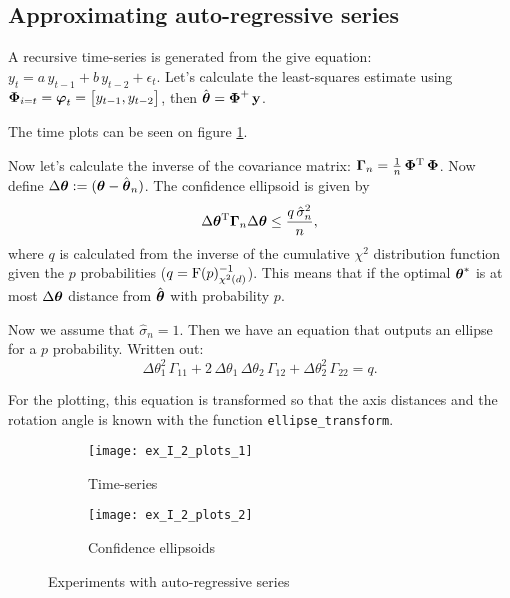 
\subsection{Approximating auto-regressive series}

A recursive time-series is generated from the give equation: $y_t = a\,y_{t-1} + b\,y_{t-2} + \epsilon_t$.
Let's calculate the least-squares estimate using $\boldsymbol{\mathrm{\Phi}}_{i=t} = \boldsymbol{\mathrm{\varphi}}_t = \begin{bmatrix}y_{t-1}, y_{t-2}\end{bmatrix}$,
then $\hat{\boldsymbol{\mathrm{\theta}}} = \boldsymbol{\mathrm{\Phi}}^+\,\boldsymbol{\mathrm{y}}$.

The time plots can be seen on figure \ref{fig:ex_I_2_plots_1}.

Now let's calculate the inverse of the covariance matrix: $\boldsymbol{\mathrm{\Gamma}}_n = \frac{1}{n}\,\boldsymbol{\mathrm{\Phi}}\textsuperscript{T}\,\boldsymbol{\mathrm{\Phi}}$. Now define
$\Delta\boldsymbol{\mathrm{\theta}} := (\boldsymbol{\mathrm{\theta}} - \hat{\boldsymbol{\mathrm{\theta}}}_n)$.
The confidence ellipsoid is given by 
\begin{equation}
	\Delta\boldsymbol{\mathrm{\theta}}\textsuperscript{T}\boldsymbol{\mathrm{\Gamma}}_n\Delta\boldsymbol{\mathrm{\theta}}\leq\frac{q\,\hat{\sigma}_n^2}{n},
\end{equation}
where $q$ is calculated from the inverse of the cumulative $\chi^2$ distribution function given the $p$
probabilities ($q = \mathrm{F}(p)_{\chi^2(d)}^{-1}$). This means that if the optimal $\boldsymbol{\mathrm{\theta}}^*$
is at most $\Delta\boldsymbol{\mathrm{\theta}}$ distance from $\hat{\boldsymbol{\mathrm{\theta}}}$ with probability $p$.

Now we assume that $\hat{\sigma}_n=1$. Then we have an equation that outputs an ellipse for a $p$ probability.
Written out:
\begin{equation}
	\Delta\theta_1^2\,\Gamma_{11} + 2\,\Delta\theta_1\,\Delta\theta_2\,\Gamma_{12} + \Delta\theta_2^2\,\Gamma_{22} = q.
\end{equation}

For the plotting, this equation is transformed so that the axis distances and the rotation 
angle is known with the function \verb|ellipse_transform|\cite{ellipse}.

\begin{figure}[H]
	\centering
	\begin{subfigure}[b]{.49\textwidth}
		\centering
		\texttt{[image: ex\_I\_2\_plots\_1]}
		\caption{Time-series}
		\label{fig:ex_I_2_plots_1}
	\end{subfigure}\hfill
	\begin{subfigure}[b]{.49\textwidth}
		\centering
		\texttt{[image: ex\_I\_2\_plots\_2]}
		\caption{Confidence ellipsoids}
		\label{fig:ex_I_2_plots_2}
	\end{subfigure}
	\caption{Experiments with auto-regressive series}
\end{figure}

